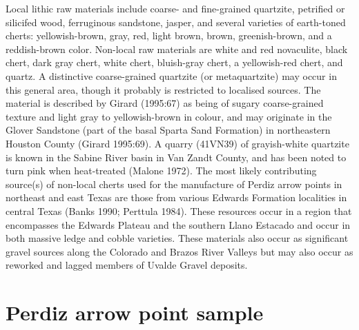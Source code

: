\documentclass[review]{elsarticle}
\begin{document}
Local lithic raw materials include coarse- and fine-grained quartzite, petrified or silicifed wood, ferruginous sandstone, jasper, and several varieties of earth-toned cherts: yellowish-brown, gray, red, light brown, brown, greenish-brown, and a reddish-brown color. Non-local raw materials are white and red novaculite, black chert, dark gray chert, white chert, bluish-gray chert, a yellowish-red chert, and quartz. A distinctive coarse-grained quartzite (or metaquartzite) may occur in this general area, though it probably is restricted to localised sources. The material is described by Girard (1995:67) as being of sugary coarse-grained texture and light gray to yellowish-brown in colour, and may originate in the Glover Sandstone (part of the basal Sparta Sand Formation) in northeastern Houston County (Girard 1995:69). A quarry (41VN39) of grayish-white quartzite is known in the Sabine River basin in Van Zandt County, and has been noted to turn pink when heat-treated (Malone 1972).
The most likely contributing source(s) of non-local cherts used for the manufacture of Perdiz arrow points in northeast and east Texas are those from various Edwards Formation localities in central Texas (Banks 1990; Perttula 1984). These resources occur in a region that encompasses the Edwards Plateau and the southern Llano Estacado and occur in both massive ledge and cobble varieties. These materials also occur as significant gravel sources along the Colorado and Brazos River Valleys but may also occur as reworked and lagged members of Uvalde Gravel deposits.

\section*{Perdiz arrow point sample}
\end{document}
